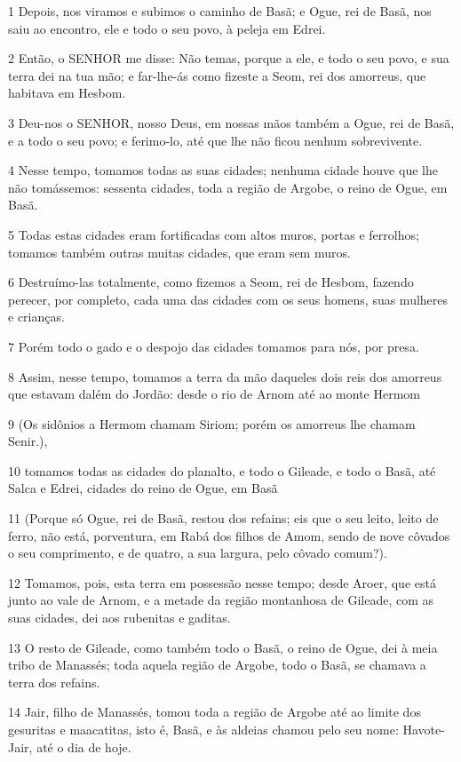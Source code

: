 \par 1 Depois, nos viramos e subimos o caminho de Basã; e Ogue, rei de Basã, nos saiu ao encontro, ele e todo o seu povo, à peleja em Edrei.
\par 2 Então, o SENHOR me disse: Não temas, porque a ele, e todo o seu povo, e sua terra dei na tua mão; e far-lhe-ás como fizeste a Seom, rei dos amorreus, que habitava em Hesbom.
\par 3 Deu-nos o SENHOR, nosso Deus, em nossas mãos também a Ogue, rei de Basã, e a todo o seu povo; e ferimo-lo, até que lhe não ficou nenhum sobrevivente.
\par 4 Nesse tempo, tomamos todas as suas cidades; nenhuma cidade houve que lhe não tomássemos: sessenta cidades, toda a região de Argobe, o reino de Ogue, em Basã.
\par 5 Todas estas cidades eram fortificadas com altos muros, portas e ferrolhos; tomamos também outras muitas cidades, que eram sem muros.
\par 6 Destruímo-las totalmente, como fizemos a Seom, rei de Hesbom, fazendo perecer, por completo, cada uma das cidades com os seus homens, suas mulheres e crianças.
\par 7 Porém todo o gado e o despojo das cidades tomamos para nós, por presa.
\par 8 Assim, nesse tempo, tomamos a terra da mão daqueles dois reis dos amorreus que estavam dalém do Jordão: desde o rio de Arnom até ao monte Hermom
\par 9 (Os sidônios a Hermom chamam Siriom; porém os amorreus lhe chamam Senir.),
\par 10 tomamos todas as cidades do planalto, e todo o Gileade, e todo o Basã, até Salca e Edrei, cidades do reino de Ogue, em Basã
\par 11 (Porque só Ogue, rei de Basã, restou dos refains; eis que o seu leito, leito de ferro, não está, porventura, em Rabá dos filhos de Amom, sendo de nove côvados o seu comprimento, e de quatro, a sua largura, pelo côvado comum?).
\par 12 Tomamos, pois, esta terra em possessão nesse tempo; desde Aroer, que está junto ao vale de Arnom, e a metade da região montanhosa de Gileade, com as suas cidades, dei aos rubenitas e gaditas.
\par 13 O resto de Gileade, como também todo o Basã, o reino de Ogue, dei à meia tribo de Manassés; toda aquela região de Argobe, todo o Basã, se chamava a terra dos refains.
\par 14 Jair, filho de Manassés, tomou toda a região de Argobe até ao limite dos gesuritas e maacatitas, isto é, Basã, e às aldeias chamou pelo seu nome: Havote-Jair, até o dia de hoje.
